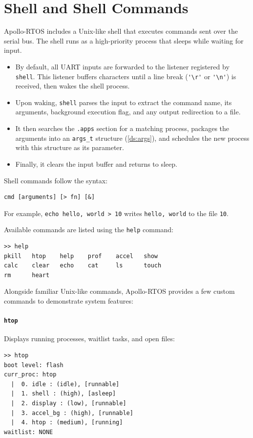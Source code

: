 \section{Shell and Shell Commands}
\label{sec:shell}

Apollo-RTOS includes a Unix-like shell that executes commands sent over the serial bus.
The shell runs as a high-priority process that sleeps while waiting for input.

\begin{itemize}
    \item By default, all UART inputs are forwarded to the listener registered by
        \lstinline[style=myagc]|shell|. This listener buffers characters until a line
        break (\lstinline[style=myagc]|'\r'| or \lstinline[style=myagc]|'\n'|) is
        received, then wakes the shell process.
    \item Upon waking, \lstinline[style=myagc]|shell| parses the input to extract the
        command name, its arguments, background execution flag, and any output
        redirection to a file.
    \item It then searches the \lstinline[style=myagc]|.apps| section for a matching
    process, packages the arguments into an \lstinline[style=myagc]|args_t| structure
    (\autoref{ds:args}), and schedules the new process with this structure as its
        parameter.
    \item Finally, it clears the input buffer and returns to sleep.
\end{itemize}

Shell commands follow the syntax:
\begin{lstlisting}[style=mytty]
cmd [arguments] [> fn] [&]
\end{lstlisting}
For example, \lstinline[style=mytty]|echo hello, world > 10| writes
\lstinline[style=mytty]|hello, world| to the file \lstinline[style=mytty]|10|.

Available commands are listed using the \lstinline[style=myagc]|help| command:
\begin{lstlisting}[style=mytty]
>> help
pkill   htop    help    prof    accel   show
calc    clear   echo    cat     ls      touch
rm      heart   
\end{lstlisting}

Alongside familiar Unix-like commands, Apollo-RTOS provides a few custom commands to
demonstrate system features:

\paragraph*{\lstinline[style=myagc]|htop|} Displays running processes, waitlist tasks,
and open files:
\vspace{1em}
\begin{lstlisting}[style=mytty]
>> htop
boot level: flash
curr_proc: htop
  |  0. idle : (idle), [runnable]
  |  1. shell : (high), [asleep]
  |  2. display : (low), [runnable]
  |  3. accel_bg : (high), [runnable]
  |  4. htop : (medium), [running]
waitlist: NONE
\end{lstlisting}

